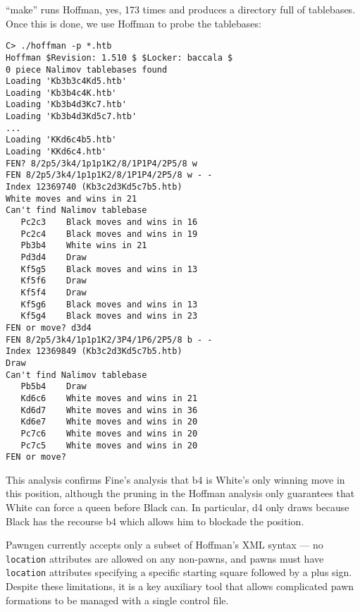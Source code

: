 \documentclass[11pt]{article}
\begin{document}
``make'' runs Hoffman, yes, 173 times and produces a directory full of
tablebases.  Once this is done, we use Hoffman to probe the tablebases:

\begin{verbatim}
C> ./hoffman -p *.htb
Hoffman $Revision: 1.510 $ $Locker: baccala $
0 piece Nalimov tablebases found
Loading 'Kb3b3c4Kd5.htb'
Loading 'Kb3b4c4K.htb'
Loading 'Kb3b4d3Kc7.htb'
Loading 'Kb3b4d3Kd5c7.htb'
...
Loading 'KKd6c4b5.htb'
Loading 'KKd6c4.htb'
FEN? 8/2p5/3k4/1p1p1K2/8/1P1P4/2P5/8 w
FEN 8/2p5/3k4/1p1p1K2/8/1P1P4/2P5/8 w - -
Index 12369740 (Kb3c2d3Kd5c7b5.htb)
White moves and wins in 21
Can't find Nalimov tablebase
   Pc2c3    Black moves and wins in 16
   Pc2c4    Black moves and wins in 19
   Pb3b4    White wins in 21
   Pd3d4    Draw
   Kf5g5    Black moves and wins in 13
   Kf5f6    Draw
   Kf5f4    Draw
   Kf5g6    Black moves and wins in 13
   Kf5g4    Black moves and wins in 23
FEN or move? d3d4
FEN 8/2p5/3k4/1p1p1K2/3P4/1P6/2P5/8 b - -
Index 12369849 (Kb3c2d3Kd5c7b5.htb)
Draw
Can't find Nalimov tablebase
   Pb5b4    Draw
   Kd6c6    White moves and wins in 21
   Kd6d7    White moves and wins in 36
   Kd6e7    White moves and wins in 20
   Pc7c6    White moves and wins in 20
   Pc7c5    White moves and wins in 20
FEN or move?
\end{verbatim}

This analysis confirms Fine's analysis that b4 is White's only winning
move in this position, although the pruning in the Hoffman analysis
only guarantees that White can force a queen before Black can.  In
particular, d4 only draws because Black has the recourse b4 which
allows him to blockade the position.

Pawngen currently accepts only a subset of Hoffman's XML syntax --- no
{\tt location} attributes are allowed on any non-pawns, and pawns must
have {\tt location} attributes specifying a specific starting square
followed by a plus sign.  Despite these limitations, it is a key
auxiliary tool that allows complicated pawn formations to be managed
with a single control file.
\end{document}
